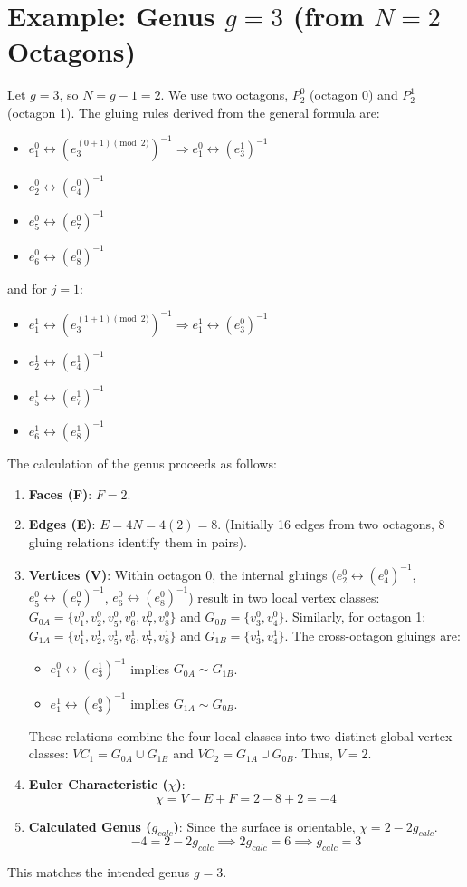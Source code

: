 \documentclass{article}
\theoremstyle{definition}
\theoremstyle{remark}
\begin{document}
\section{Example: Genus $g=3$ (from $N=2$ Octagons)}
Let $g=3$, so $N=g-1=2$. We use two octagons, $P_2^0$ (octagon 0) and $P_2^1$ (octagon 1). The gluing rules derived from the general formula are:
\begin{itemize}
    \item $e_1^0 \leftrightarrow (e_3^{(0+1)\pmod 2})^{-1} \Rightarrow e_1^0 \leftrightarrow (e_3^1)^{-1}$
    \item $e_2^0 \leftrightarrow (e_4^0)^{-1}$
    \item $e_5^0 \leftrightarrow (e_7^0)^{-1}$
    \item $e_6^0 \leftrightarrow (e_8^0)^{-1}$
\end{itemize}
and for $j=1$:
\begin{itemize}
    \item $e_1^1 \leftrightarrow (e_3^{(1+1)\pmod 2})^{-1} \Rightarrow e_1^1 \leftrightarrow (e_3^0)^{-1}$
    \item $e_2^1 \leftrightarrow (e_4^1)^{-1}$
    \item $e_5^1 \leftrightarrow (e_7^1)^{-1}$
    \item $e_6^1 \leftrightarrow (e_8^1)^{-1}$
\end{itemize}
The calculation of the genus proceeds as follows:
\begin{enumerate}
    \item \textbf{Faces (F)}: $F=2$.
    \item \textbf{Edges (E)}: $E=4N = 4(2) = 8$. (Initially 16 edges from two octagons, 8 gluing relations identify them in pairs).
    \item \textbf{Vertices (V)}:
        Within octagon 0, the internal gluings ($e_2^0 \leftrightarrow (e_4^0)^{-1}$, $e_5^0 \leftrightarrow (e_7^0)^{-1}$, $e_6^0 \leftrightarrow (e_8^0)^{-1}$) result in two local vertex classes: $G_{0A} = \{v_1^0, v_2^0, v_5^0, v_6^0, v_7^0, v_8^0\}$ and $G_{0B} = \{v_3^0, v_4^0\}$.
        Similarly, for octagon 1: $G_{1A} = \{v_1^1, v_2^1, v_5^1, v_6^1, v_7^1, v_8^1\}$ and $G_{1B} = \{v_3^1, v_4^1\}$.
        The cross-octagon gluings are:
        \begin{itemize}
            \item $e_1^0 \leftrightarrow (e_3^1)^{-1}$ implies $G_{0A} \sim G_{1B}$.
            \item $e_1^1 \leftrightarrow (e_3^0)^{-1}$ implies $G_{1A} \sim G_{0B}$.
        \end{itemize}
        These relations combine the four local classes into two distinct global vertex classes: $VC_1 = G_{0A} \cup G_{1B}$ and $VC_2 = G_{1A} \cup G_{0B}$.
        Thus, $V=2$.
    \item \textbf{Euler Characteristic ($\chi$)}:
    $$ \chi = V - E + F = 2 - 8 + 2 = -4 $$
    \item \textbf{Calculated Genus ($g_{calc}$)}:
    Since the surface is orientable, $\chi = 2 - 2g_{calc}$.
    $$ -4 = 2 - 2g_{calc} \implies 2g_{calc} = 6 \implies g_{calc} = 3 $$
\end{enumerate}
This matches the intended genus $g=3$.
\end{document}
